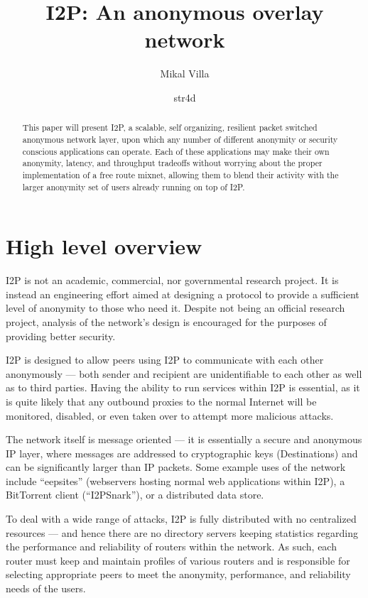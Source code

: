 \documentclass[a4paper,twocolumn,12pt]{article}
\title{I2P: An anonymous overlay network}
\author{
Mikal Villa
\and
str4d
}
\begin{document}
\maketitle

\begin{abstract}\noindent
This paper will present I2P, a scalable, self organizing, resilient packet
switched anonymous network layer, upon which any number of different
anonymity or security conscious applications can operate. Each of these
applications may make their own anonymity, latency, and throughput tradeoffs
without worrying about the proper implementation of a free route mixnet,
allowing them to blend their activity with the larger anonymity set of users
already running on top of I2P.
\end{abstract}

\tableofcontents

\section{High level overview}
I2P is not an academic, commercial, nor governmental research project. It is 
instead an engineering effort aimed at designing a protocol to provide a 
sufficient level of anonymity to those who need it. Despite not being an 
official research project, analysis of the network's design is encouraged for 
the purposes of providing better security.

I2P is designed to allow peers using I2P to communicate with each other
anonymously --- both sender and recipient are unidentifiable to each other
as well as to third parties. Having the ability to run services within I2P
is essential, as it is quite likely that any outbound proxies to the normal
Internet will be monitored, disabled, or even taken over to attempt more
malicious attacks.

The network itself is message oriented --- it is essentially a secure and anonymous
IP layer, where messages are addressed to cryptographic keys (Destinations) and can
be significantly larger than IP packets. Some example uses of the network include
``eepsites'' (webservers hosting normal web applications within I2P), a BitTorrent\cite{cohen08specification}
client (``I2PSnark''), or a distributed data store.

To deal with a wide range of attacks, I2P is fully distributed with no centralized
resources --- and hence there are no directory servers keeping statistics regarding
the performance and reliability of routers within the network. As such, each router
must keep and maintain profiles of various routers and is responsible for selecting
appropriate peers to meet the anonymity, performance, and reliability needs of the users.
\end{document}
